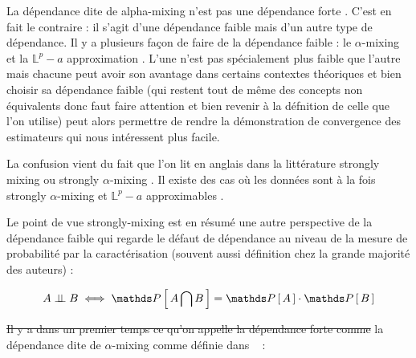 

\begin{leftbar}
    La dépendance dite de \og alpha-mixing \fg n'est pas une dépendance \og forte \fg. C'est en fait le contraire : il s'agit d'une dépendance faible mais d'un autre type de dépendance. Il y a plusieurs façon de faire de la dépendance faible : le \og $\alpha$-mixing \fg et la \og $\mathds L^p-a$ approximation \fg. L'une n'est pas spécialement plus faible que l'autre mais chacune peut avoir son avantage dans certains contextes théoriques et bien choisir sa dépendance faible (qui restent tout de même des concepts non équivalents donc faut faire attention et bien revenir à la défnition de celle que l'on utilise) peut alors permettre de rendre la démonstration de convergence des estimateurs qui nous intéressent plus facile. 

    La confusion vient du fait que l'on lit en anglais dans la littérature \og strongly mixing \fg ou \og strongly $\alpha$-mixing \fg. Il existe des cas où les données sont à la fois \og strongly $\alpha$-mixing \fg et \og $\mathds L^p-a$ approximables \fg.

    Le point de vue \og strongly-mixing \fg est en résumé une autre perspective de la dépendance faible qui regarde le défaut de dépendance au niveau de la mesure de probabilité par la caractérisation (souvent aussi définition chez la grande majorité des auteurs) :

    \begin{equation*}
        A \indep B \iff \proba{ A \bigcap B } = \proba A \cdot \proba B  
    \end{equation*}
\end{leftbar}

\textcolor{flatuicolors_rose}{\sout{{Il y a dans un premier temps ce qu'on appelle la dépendance \og forte \fg comme}}} la dépendance dite de \og $\alpha$-mixing \fg comme définie dans ~\cite{estimation-dependent-strong-mixing} :


